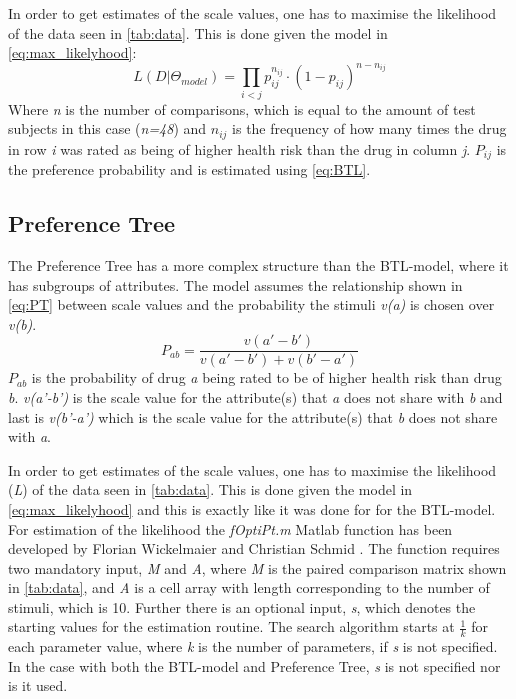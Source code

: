 In order to get estimates of the scale values, one has to maximise the likelihood of the data seen in \autoref{tab:data}. This is done given the model in \autoref{eq:max_likelyhood}: 
%
\begin{equation}
L(D|\Theta_{model}) = \prod_{i<j} p_{ij} ^{n_{ij}}\cdot(1- p_{ij})^{n-n_{ij}}
\label{eq:max_likelyhood}
\end{equation}
\noindent 
%
Where \textit{n} is the number of comparisons, which is equal to the amount of test subjects in this case (\textit{n=48}) and $n_{ij}$ is the frequency of how many times the drug in row \textit{i} was rated as being of higher health risk than the drug in column \textit{j}. $P_{ij}$ is the preference probability and is estimated using \autoref{eq:BTL}. 

\subsection*{Preference Tree}
%
The Preference Tree has a more complex structure than the BTL-model, where it has subgroups of attributes. The model assumes the relationship shown in \autoref{eq:PT} between scale values and the probability the stimuli \textit{v(a)} is chosen over \textit{v(b)}.
%
\begin{equation}
P_{ab} =\frac{v(a'-b')}{v(a'-b')+v(b'-a')} 
\label{eq:PT}
\end{equation}
\noindent
%
$P_{ab}$ is the probability of drug \textit{a} being rated to be of higher health risk than drug \textit{b}. \textit{v(a'-b')} is the scale value for the attribute(s) that \textit{a} does not share with \textit{b} and last is \textit{v(b'-a')} which is the scale value for the attribute(s) that \textit{b} does not share with \textit{a}.

In order to get estimates of the scale values, one has to maximise the likelihood (\textit{L}) of the data seen in \autoref{tab:data}. This is done given the model in \autoref{eq:max_likelyhood} and this is exactly like it was done for for the BTL-model. \blankline
%
For estimation of the likelihood the \textit{fOptiPt.m} Matlab function has been developed by Florian Wickelmaier and Christian Schmid \parencite{Wickelmaier2004}. The function requires two mandatory input, \textit{M} and \textit{A}, where \textit{M} is the paired comparison matrix shown in \autoref{tab:data}, and \textit{A} is a cell array with length corresponding to the number of stimuli, which is 10. Further there is an optional input, \textit{s}, which denotes the starting values for the estimation routine. The search algorithm starts at $\frac{1}{k}$ for each parameter value, where \textit{k} is the number of parameters, if \textit{s} is not specified. In the case with both the BTL-model and Preference Tree, \textit{s} is not specified nor is it used.
\vfill